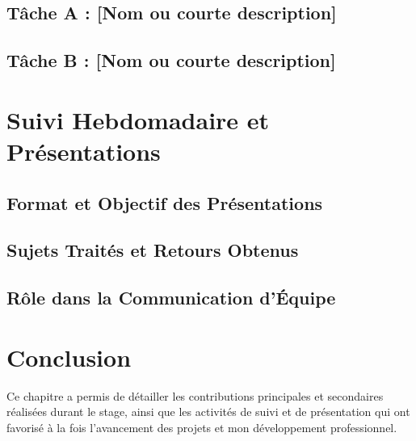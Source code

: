 \subsection{Tâche A : [Nom ou courte description]}

\subsection{Tâche B : [Nom ou courte description]}


\section{Suivi Hebdomadaire et Présentations}
\subsection{Format et Objectif des Présentations}

\subsection{Sujets Traités et Retours Obtenus}

\subsection{Rôle dans la Communication d'Équipe}

\section{Conclusion}
Ce chapitre a permis de détailler les contributions principales et secondaires réalisées durant le stage, ainsi que les activités de suivi et de présentation qui ont favorisé à la fois l'avancement des projets et mon développement professionnel.
